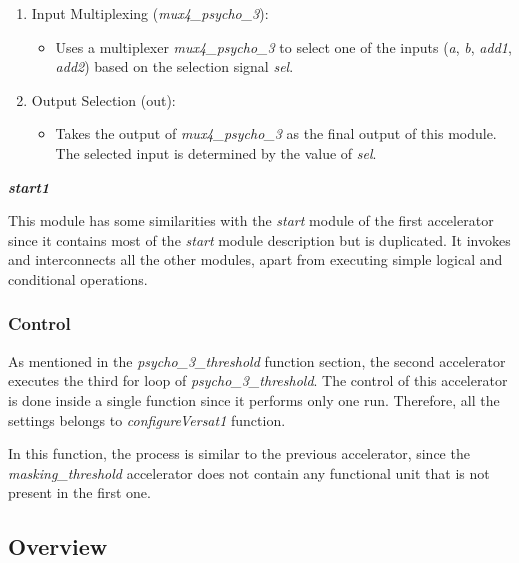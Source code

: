 \begin{enumerate}

\item Input Multiplexing (\textit{mux4\_psycho\_3}):
\begin{itemize}
\item Uses a multiplexer \textit{mux4\_psycho\_3} to select one of the inputs (\textit{a}, \textit{b}, \textit{add1}, \textit{add2}) based on the selection signal \textit{sel}.
\end{itemize}

\item Output Selection (out):
\begin{itemize}
\item Takes the output of \textit{mux4\_psycho\_3} as the final output of this module. The selected input is determined by the value of \textit{sel}.
\end{itemize}

\end{enumerate}

\vspace{0.5cm}

\textbf{\textit{start1}}

This module has some similarities with the \textit{start} module of the first accelerator since it contains most of the \textit{start} module description but is duplicated.
It invokes and interconnects all the other modules, apart from executing simple logical and conditional operations.

\subsubsection{Control}

As mentioned in the \textit{psycho\_3\_threshold} function section, the second accelerator executes the third for loop of \textit{psycho\_3\_threshold}.
The control of this accelerator is done inside a single function since it performs only one run. Therefore, all the settings belongs to \textit{configureVersat1} function.

In this function, the process is similar to the previous accelerator, since the \textit{masking\_threshold} accelerator does not contain any functional unit that is not present in the first one.

\subsection{Overview}

